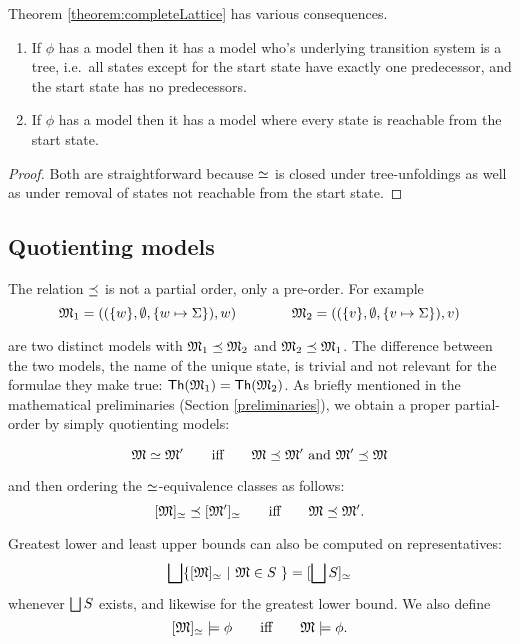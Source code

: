 Theorem \ref{theorem:completeLattice} has various
consequences.

\begin{corollary}
\begin{enumerate}

\item If $\phi$ has a model then it has a model who's underlying
  transition system is a tree, i.e.~all states except for the start state
  have exactly one predecessor, and the start state has no predecessors.

\item If $\phi$ has a model then it has a model where every state is
  reachable from the start state.

\end{enumerate}
\end{corollary}
\begin{proof}
Both are straightforward because $\simeq$ is closed under
tree-unfoldings as well as under removal of states not reachable from
the start state.
\end{proof}


\subsection{Quotienting models}

\NI The relation $\preceq$ is not a partial order, only a
pre-order. For example 
\[
   \frak{M}_1 = ( (\{w\}, \emptyset, \{w \mapsto \Sigma\}), w)
      \qquad\qquad
   \frak{M}_2 = ( (\{v\}, \emptyset, \{v \mapsto \Sigma\}), v)
\]

\NI are two distinct models with $\frak{M}_1 \preceq \frak{M}_2$ and $\frak{M}_2
\preceq \frak{M}_1$. The difference between the two models, the name of
the unique state, is trivial and not relevant for the formulae they
make true: $\mathsf{Th}(\frak{M}_1) = \mathsf{Th}(\frak{M}_2)$.  As briefly mentioned
in the mathematical preliminaries (Section \ref{preliminaries}), we
obtain a proper partial-order by simply quotienting models:

\[
   \frak{M} \simeq \frak{M}'
      \qquad\text{iff}\qquad
   \frak{M} \preceq \frak{M}' \ \text{and}\ \frak{M}' \preceq \frak{M}
\]

\NI and then ordering the $\simeq$-equivalence classes as follows:
\[
    [\frak{M}]_{\simeq} \preceq [\frak{M}']_{\simeq}
      \qquad\text{iff}\qquad
    \frak{M} \preceq \frak{M}'.
\]

\NI Greatest lower and least upper bounds can also be computed on
representatives:
\[
   \bigsqcup \{[\frak{M}]_{\simeq} \ |\ \frak{M} \in S\ \} = [\bigsqcup S]_{\simeq}
\]
whenever $\bigsqcup S$ exists, and likewise for the greatest lower bound.
We also define 
\[
   [\frak{M}]_{\simeq} \models \phi 
      \qquad\text{iff}\qquad
   \frak{M} \models \phi.
\]

